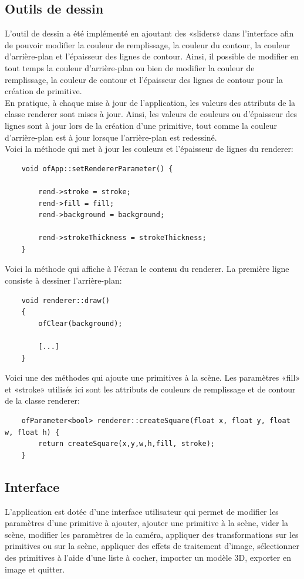 \subsection{Outils de dessin}
L'outil de dessin a été implémenté en ajoutant des «sliders» dans l'interface afin de pouvoir modifier la couleur de remplissage, la couleur du contour, la couleur d'arrière-plan et l'épaisseur des lignes de contour. Ainsi, il possible de modifier en tout temps la couleur d'arrière-plan ou bien de modifier la couleur de remplissage, la couleur de contour et l'épaisseur des lignes de contour pour la création de primitive.\\

En pratique, à chaque mise à jour de l'application, les valeurs des attributs de la classe renderer sont mises à jour. Ainsi, les valeurs de couleurs ou d'épaisseur des lignes sont à jour lors de la création d'une primitive, tout comme la couleur d'arrière-plan est à jour lorsque l'arrière-plan est redessiné. \\ 

Voici la méthode qui met à jour les couleurs et l'épaisseur de lignes du renderer:
\begin{lstlisting}
	void ofApp::setRendererParameter() {
		
		rend->stroke = stroke;
		rend->fill = fill;
		rend->background = background;
		
		rend->strokeThickness = strokeThickness;
	}
\end{lstlisting}

Voici la méthode qui affiche à l'écran le contenu du renderer. La première ligne consiste à dessiner l'arrière-plan:
\begin{lstlisting}
	void renderer::draw()
	{
		ofClear(background);
		
		[...]
	}
\end{lstlisting}

Voici une des méthodes qui ajoute une primitives à la scène. Les paramètres «fill» et «stroke» utilisés ici sont les attributs de couleurs de remplissage et de contour de la classe renderer:
\begin{lstlisting}
	ofParameter<bool> renderer::createSquare(float x, float y, float w, float h) {
		return createSquare(x,y,w,h,fill, stroke);
	}
\end{lstlisting}

\subsection{Interface}
L'application est dotée d'une interface utilisateur qui permet de modifier les paramètres d'une primitive à ajouter, ajouter une primitive à la scène, vider la scène, modifier les paramètres de la caméra, appliquer des transformations sur les primitives ou sur la scène, appliquer des effets de traitement d'image, sélectionner des primitives à l'aide d'une liste à cocher, importer un modèle 3D, exporter en image et quitter. \\

